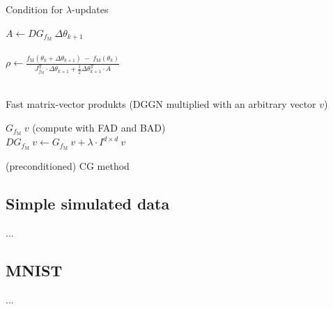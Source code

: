 \documentclass[conference]{IEEEtran}
\begin{document}
\begin{algorithm}
	\caption{Condition for $\lambda$-updates}\label{alg:three}
	$A\gets DG_{f_{\mathrm{M}}}\:\Delta\theta_{k+1}$\\
		\text{}\\
	$\rho\gets \frac{f_{\mathrm{M}}(\theta_{k}+\Delta\theta_{k+1})\:-\: f_{\mathrm{M}}(\theta_{k})}{J_{f_{\mathrm{M}}}^{\mathrm{T}}\cdot\Delta\theta_{k+1} + \frac{1}{2}\Delta\theta_{k+1}^{\mathrm{T}}\cdot A}$\\
	\text{}\\
	\Output{$\lambda$}
\end{algorithm}

\begin{algorithm}
	\caption{Fast matrix-vector produkts (DGGN multiplied with an arbitrary vector $v$)}\label{alg:four}
	$G_{f_{\mathrm{M}}}\:v$ (compute with FAD and BAD)\\
	$DG_{f_{\mathrm{M}}}\: v \gets G_{f_{\mathrm{M}}}\: v + \lambda\cdot I^{d\times d}\:v$\\
\end{algorithm}

\begin{algorithm}
	\caption{(preconditioned) CG method}\label{alg:five}
	
\end{algorithm}

\subsection{Simple simulated data}
...

\subsection{MNIST}
...
\end{document}
